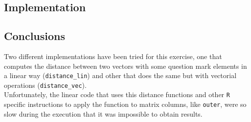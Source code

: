 \documentclass[12pt,a4paper]{article}
\begin{document}
\begin{singlespace}
\subsection{Implementation}


\vspace{-0.4cm}
\subsection{Conclusions}
Two different implementations have been tried for this exercise, one that computes the distance between two vectors with some question mark elements in a linear way (\texttt{distance\_lin}) and other that does the same but with vectorial operations (\texttt{distance\_vec}). \\

Unfortunately, the linear code that uses this distance functions and other \texttt{R} specific instructions to apply the function to matrix columns, like \texttt{outer}, were so slow during the execution that it was impossible to obtain results.

\end{singlespace}
\end{document}
